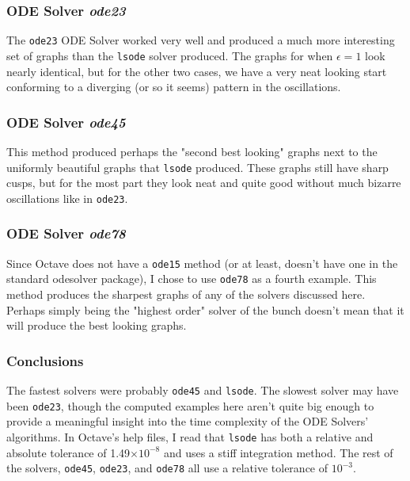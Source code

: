 \documentclass[11pt]{article}
\begin{document}
\subsubsection*{ODE Solver \emph{ode23}}
The \verb|ode23| ODE Solver worked very well and produced a much more interesting set of graphs
than the \verb|lsode| solver produced.
The graphs for when $\epsilon = 1$ look nearly identical, but for the other two cases, we have a 
very neat looking start conforming to a diverging (or so it seems) pattern in the oscillations.
\subsubsection*{ODE Solver \emph{ode45}}
This method produced perhaps the "second best looking" graphs next to the uniformly beautiful graphs
that \verb|lsode| produced.
These graphs still have sharp cusps, but for the most part they look neat and quite good without
much bizarre oscillations like in \verb|ode23|.

\subsubsection*{ODE Solver \emph{ode78}}
Since Octave does not have a \verb|ode15| method (or at least, doesn't have one in the standard 
odesolver package), I chose to use \verb|ode78| as a fourth example.
This method produces the sharpest graphs of any of the solvers discussed here.
Perhaps simply being the "highest order" solver of the bunch doesn't mean that it will produce
the best looking graphs.

\subsubsection*{Conclusions}
The fastest solvers were probably \verb|ode45| and \verb|lsode|. The slowest solver may have been
\verb|ode23|, though the computed examples here aren't quite big enough to provide a meaningful
insight into the time complexity of the ODE Solvers' algorithms.
In Octave's help files, I read that \verb|lsode| has both a relative and absolute tolerance of 1.49$\times 10 ^ {-8}$
and uses a stiff integration method.
The rest of the solvers, \verb|ode45|, \verb|ode23|, and \verb|ode78| all use a relative tolerance of $10^{-3}$.
\end{document}
